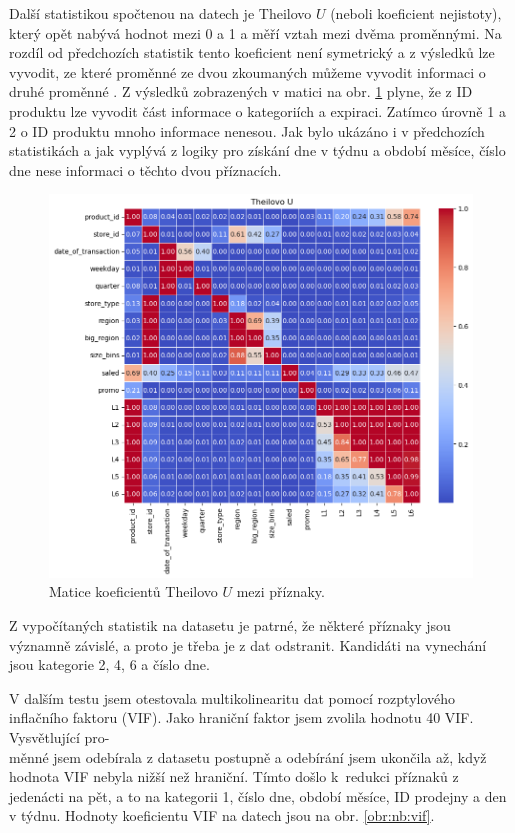 Další statistikou spočtenou na datech je Theilovo $U$ (neboli koeficient nejistoty), který opět nabývá hodnot mezi 0 a 1 a měří vztah mezi dvěma proměnnými. Na rozdíl od předchozích statistik tento koeficient není symetrický a z výsledků lze vyvodit, ze které proměnné ze dvou zkoumaných můžeme vyvodit informaci o druhé proměnné \cite{bib:correl}. Z výsledků zobrazených v matici na obr. \ref*{obr:nb:thiels} plyne, že z ID produktu lze vyvodit část informace o kategoriích a expiraci. Zatímco úrovně 1 a 2 o ID produktu mnoho informace nenesou. Jak bylo ukázáno i v předchozích statistikách a jak vyplývá z logiky pro získání dne v týdnu a období měsíce, číslo dne nese informaci o těchto dvou příznacích.

\begin{figure}[hbtp!]
    \centering
    \includegraphics[width=.8\textwidth]{obrazky/pripravadat/theils_u-002.png}
    \caption{Matice koeficientů Theilovo $U$ mezi příznaky.}
    \label{obr:nb:thiels}
\end{figure}

Z vypočítaných statistik na datasetu je patrné, že některé příznaky jsou významně závislé, a proto je třeba je z dat odstranit. Kandidáti na vynechání jsou kategorie 2, 4, 6 a číslo dne. 

V dalším testu jsem otestovala multikolinearitu dat pomocí rozptylového inflačního faktoru (VIF). Jako hraniční faktor jsem zvolila hodnotu 40 VIF. 
Vysvětlující pro-\\měnné jsem odebírala z datasetu postupně a odebírání jsem ukončila až, když hodnota VIF nebyla nižší než hraniční.
Tímto došlo k~redukci příznaků z jedenácti na pět, a to na kategorii 1, číslo dne, období měsíce, ID prodejny a den v týdnu. Hodnoty koeficientu VIF na datech jsou na obr. \ref*{obr:nb:vif}. 

